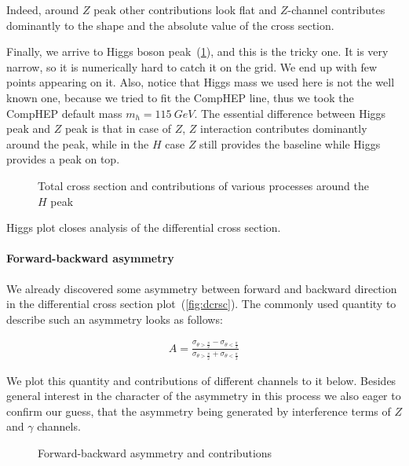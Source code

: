 \documentclass{article}
\begin{document}
Indeed, around $Z$ peak other contributions look flat and $Z$-channel contributes dominantly to the shape and the absolute value of the cross section.

Finally, we arrive to Higgs boson peak~(\cref{fig:totcrsc_Hpeak}), and this is the tricky one. It is very narrow, so it is numerically hard to catch it on the grid. We end up with few points appearing on it. Also, notice that Higgs mass we used here is not the well known one, because we tried to fit the CompHEP line, thus we took the CompHEP default mass $m_h = 115~GeV$. The essential difference between Higgs peak and $Z$ peak is that in case of $Z$, $Z$ interaction contributes dominantly around the peak, while in the $H$ case $Z$ still provides the baseline while Higgs provides a peak on top.

\begin{figure}[H]
    \centering
    \hfill%
    \caption{Total cross section and contributions of various processes around the $H$ peak}%
    \label{fig:totcrsc_Hpeak}
\end{figure}

Higgs plot closes analysis of the differential cross section.

\paragraph{Forward-backward asymmetry} We already discovered some asymmetry between forward and backward direction in the differential cross section plot~(\cref{fig:dcrsc}). The commonly used quantity to describe such an asymmetry looks as follows:

\begin{align}
    A = \frac{\sigma_{\theta > \frac{\pi}{2}} - \sigma_{\theta < \frac{\pi}{2}}}{\sigma_{\theta > \frac{\pi}{2}} + \sigma_{\theta < \frac{\pi}{2}}}
\end{align}

We plot this quantity and contributions of different channels to it below. Besides general interest in the character of the asymmetry in this process we also eager to confirm our guess, that the asymmetry being generated by interference terms of $Z$ and $\gamma$ channels.

\begin{figure}[H]
    \centering
    \hfill%
    \caption{Forward-backward asymmetry and contributions}%
    \label{fig:fbasym}
\end{figure}
\end{document}
